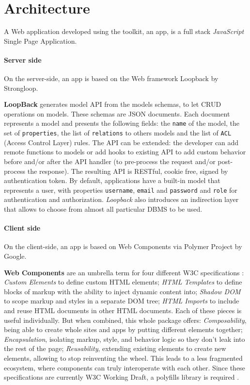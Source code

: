 \section{Architecture}\label{sec:architecture}

A Web application developed using the  toolkit, an  app, is a full stack {\em JavaScript} Single Page Application.

\paragraph{Server side}
On the server-side, an  app is based on the Web framework Loopback by Strongloop.

{\bf LoopBack} generates model API from the models schemas, to let CRUD operations on models.
These schemas are JSON documents. Each document represents a model and presents the following fields: the \texttt{name} of the model, the set of \texttt{properties}, the list of \texttt{relations} to others models and the list of \texttt{ACL} (Access Control Layer) rules. 
The API can be extended: the developer can add remote functions to models or add hooks to existing API to add custom behavior before and/or after the API handler (to pre-process the request and/or post-process the response). 
The resulting API is RESTful, cookie free, signed by authentication token.
By default, applications have a built-in model that represents a user, with properties \texttt{username}, \texttt{email} and \texttt{password} and \texttt{role} for authentication and authorization.
{\em Loopback} also introduces an indirection layer that allows to choose from almost all particular DBMS to be used.

\paragraph{Client side}
On the client-side, an  app is based on Web Components via Polymer Project by Google.

{\bf Web Components} are an umbrella term for four different W3C specifications \cite{w3c}:
\emph{Custom Elements} to define custom HTML elements;
\emph{HTML Templates} to define blocks of markup with the ability to inject dynamic content into;
\emph{Shadow DOM} to scope markup and styles in a separate DOM tree;
\emph{HTML Imports} to include and reuse HTML documents in other HTML documents.
Each of these pieces is useful individually. But when combined, this whole package offers:
\emph{Composability}, being able to create whole sites and apps by putting different elements together;
\emph{Encapsulation}, isolating markup, style, and behavior logic so they don't leak into the rest of the page;
\emph{Reusability}, extending existing elements to create new elements, allowing to stop reinventing the wheel.
This leads to a less fragmented ecosystem, where components can truly interoperate with each other.
Since these specifications are currently W3C Working Draft, a polyfills library is required \cite{webcomponents-polyfills}.
        
